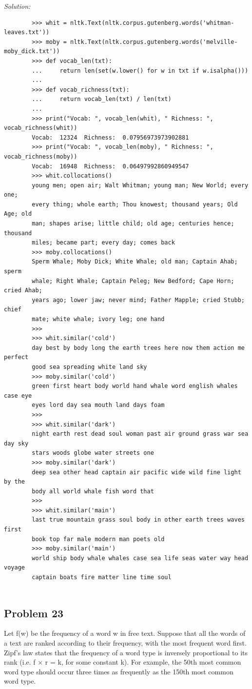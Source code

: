 \documentclass[11pt]{article}
\newenvironment{solution}{
	\vspace{10px}\noindent\emph{Solution:}
}{
	\vspace{10px}
}
\begin{document}
\begin{solution}
	\begin{lstlisting}
		>>> whit = nltk.Text(nltk.corpus.gutenberg.words('whitman-leaves.txt'))
		>>> moby = nltk.Text(nltk.corpus.gutenberg.words('melville-moby_dick.txt'))
		>>> def vocab_len(txt):
		...     return len(set(w.lower() for w in txt if w.isalpha()))
		...
		>>> def vocab_richness(txt):
		...     return vocab_len(txt) / len(txt)
		...
		>>> print("Vocab: ", vocab_len(whit), " Richness: ", vocab_richness(whit))
		Vocab:  12324  Richness:  0.07956973973902881
		>>> print("Vocab: ", vocab_len(moby), " Richness: ", vocab_richness(moby))
		Vocab:  16948  Richness:  0.06497992860949547
		>>> whit.collocations()
		young men; open air; Walt Whitman; young man; New World; every one;
		every thing; whole earth; Thou knowest; thousand years; Old Age; old
		man; shapes arise; little child; old age; centuries hence; thousand
		miles; became part; every day; comes back
		>>> moby.collocations()
		Sperm Whale; Moby Dick; White Whale; old man; Captain Ahab; sperm
		whale; Right Whale; Captain Peleg; New Bedford; Cape Horn; cried Ahab;
		years ago; lower jaw; never mind; Father Mapple; cried Stubb; chief
		mate; white whale; ivory leg; one hand
		>>>
		>>> whit.similar('cold')
		day best by body long the earth trees here now them action me perfect
		good sea spreading white land sky
		>>> moby.similar('cold')
		green first heart body world hand whale word english whales case eye
		eyes lord day sea mouth land days foam
		>>>
		>>> whit.similar('dark')
		night earth rest dead soul woman past air ground grass war sea day sky
		stars woods globe water streets one
		>>> moby.similar('dark')
		deep sea other head captain air pacific wide wild fine light by the
		body all world whale fish word that
		>>>
		>>> whit.similar('main')
		last true mountain grass soul body in other earth trees waves first
		book top far male modern man poets old
		>>> moby.similar('main')
		world ship body whale whales case sea life seas water way head voyage
		captain boats fire matter line time soul
	
	\end{lstlisting}
	
	
\end{solution}  


\subsection*{Problem 23}
Let f(w) be the frequency of a word w in free text. Suppose that all the words of a text are ranked according to their frequency, with the most frequent word first. Zipf's law states that the frequency of a word type is inversely proportional to its rank (i.e. f × r = k, for some constant k). For example, the 50th most common word type should occur three times as frequently as the 150th most common word type.
\end{document}
